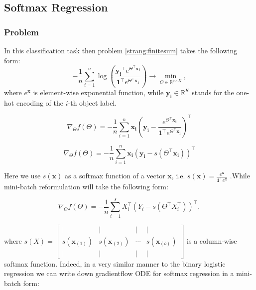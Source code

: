 \documentclass{article}
\newcommand{\vect}[1]{\boldsymbol{\mathbf{#1}}}
\begin{document}
\subsection{Softmax Regression}
\subsubsection{Problem}
In this classification task then problem \eqref{strang:finitesum} takes the following form:
\begin{equation}\label{strang:Softmax}
-\frac{1}{n} \sum_{i=1}^n\log\left(\frac{\vect{y_i}^\top e^{\Theta^\top \vect{x_i}}}{\vect{1}^\top e^{\Theta^\top \vect{x_i}}}\right) \to \min_{\Theta \in \mathbb{R}^{p \times K}},
\end{equation}
where $e^{\vect{x}}$ is element-wise exponential function, while $ \vect{y_i} \in \mathbb{R}^K$ stands for the one-hot encoding of the $i$-th object label.

\begin{equation}
\nabla_\Theta f(\Theta) = -\frac{1}{n} \sum_{i=1}^n\vect{x_i}\left(\vect{y_i} - \frac{ e^{\Theta^\top \vect{x_i}}}{\vect{1}^\top e^{\Theta^\top \vect{x_i}}}\right)^\top
\end{equation}

\begin{equation}
\nabla_\Theta f(\Theta) = -\frac{1}{n} \sum_{i=1}^n\vect{x_i}\left(\vect{y_i} - s\left(\Theta^\top \vect{x_i}\right)\right)^\top
\end{equation}


Here we use $s(\vect{x})$ as a softmax function of a vector $\vect{x}$, i.e. $s(\vect{x}) = \frac{e^{\vect{x}}}{\vect{1}^\top e^{\vect{x}}}$ .While mini-batch reformulation will take the following form:

\begin{equation}
\nabla_\Theta f(\Theta) = -\frac{1}{n} \sum_{i=1}^s X_i^\top\left(Y_i - s(\Theta^\top X_i^\top)\right)^\top,
\end{equation}

where $s(X) = \left[\begin{array}{cccc}| & | & | & | \\
s(\vect{x}_{(1)}) & s(\vect{x}_{(2)}) & \cdots & s(\vect{x}_{(b)}) \\
| & | & | & |
\end{array}\right]$ is a column-wise softmax function. Indeed, in a very similar manner to the binary logistic regression we can write down gradientflow ODE for softmax regression in a mini-batch form:
\end{document}
